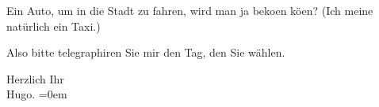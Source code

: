 \pstart
           Ein Auto, um in die Stadt zu fahren, wird man ja beko{\geminationm}en
                  kö{\geminationn}en? (Ich meine natürlich ein Taxi.)\pend
           
\pstart
           Also bitte telegraphiren Sie mir den Tag, den Sie wählen.\pend
           
\pstart
           Herzlich Ihr{\\[\baselineskip]}\spacefill\mbox{Hugo.}\pend
           \leftskip=0em{}\endnumbering{}  
      